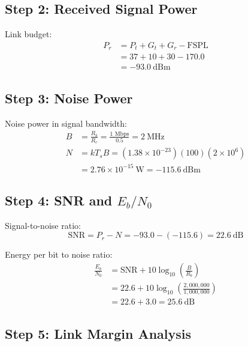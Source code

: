\subsection*{Step 2: Received Signal Power}

Link budget:
\begin{equation}
\begin{aligned}
P_r &= P_t + G_t + G_r - \text{FSPL} \\
&= 37 + 10 + 30 - 170.0 \\
&= -93.0~\text{dBm}
\end{aligned}
\end{equation}

\subsection*{Step 3: Noise Power}

Noise power in signal bandwidth:
\begin{equation}
\begin{aligned}
B &= \frac{R_b}{R_c} = \frac{1\text{~Mbps}}{0.5} = 2~\text{MHz} \\
N &= kT_sB = (1.38 \times 10^{-23})(100)(2 \times 10^6) \\
&= 2.76 \times 10^{-15}~\text{W} = -115.6~\text{dBm}
\end{aligned}
\end{equation}

\subsection*{Step 4: SNR and $E_b/N_0$}

Signal-to-noise ratio:
\begin{equation}
\text{SNR} = P_r - N = -93.0 - (-115.6) = 22.6~\text{dB}
\end{equation}

Energy per bit to noise ratio:
\begin{equation}
\begin{aligned}
\frac{E_b}{N_0} &= \text{SNR} + 10\log_{10}\left(\frac{B}{R_b}\right) \\
&= 22.6 + 10\log_{10}\left(\frac{2{,}000{,}000}{1{,}000{,}000}\right) \\
&= 22.6 + 3.0 = 25.6~\text{dB}
\end{aligned}
\end{equation}

\subsection*{Step 5: Link Margin Analysis}


